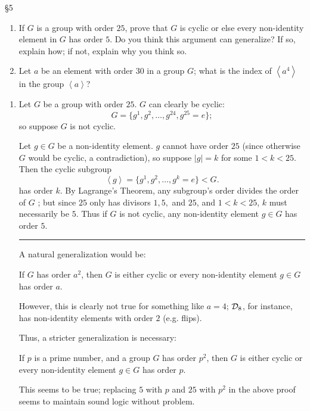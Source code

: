 \documentclass{homework}
\begin{document}
\begin{problem}{\S 5}
  \begin{enumerate}[label=(\alph*)]
    \item If $G$ is a group with order $25$, prove that $G$ is cyclic or else every non-identity
      element in $G$ has order $5$. Do you think this argument can generalize? If so, explain how;
      if not, explain why you think so.
    \item Let $a$ be an element with order $30$ in a group $G$; what is the index of $\left<a^{4}
      \right>$ in the group $\left<a \right>$?
  \end{enumerate}
\end{problem}

\begin{solution}
  \begin{enumerate}[label=(\alph*)]
    \item 
      Let $G$ be a group with order $25$. $G$ can clearly be cyclic: \[
        G=\{ g^{1},g^2,\ldots,g^{24},g^{25}=e \}
      ;\] so suppose $G$ is not cyclic.

      Let $g\in G$ be a non-identity element. $g$ cannot have order $25$ (since otherwise $G$ would be
      cyclic, a contradiction),  so suppose $\left| g \right| =k$ for some $1<k<25$. Then the cyclic
      subgroup \[
        \left<g \right> = \{ g^{1},g^2,\ldots,g^{k}=e \} < G
      .\] has order $k$. By Lagrange's Theorem, any subgroup's order divides the order of $G$ ; but
      since $25$ only has divisors $1,5,$ and $25$, and $1<k<25$, $k$ must necessarily be $5$. Thus if
      $G$ is not cyclic, any non-identity element $g\in G$ has order $5$.
      \hrule
      A natural generalization would be:
      \begin{center}
        If  $G$ has order $a^2$, then $G$ is either cyclic or every non-identity element $g\in G$ has
        order $a$.
      \end{center}
      However, this is clearly not true for something like $a=4$; $\mathcal{D}_8$, for instance, has
      non-identity elements with order $2$ (e.g. flips).

      Thus, a stricter generalization is necessary:
      \begin{center}
        If $p$ is a prime number, and a group $G$ has order $p^2$, then $G$ is either cyclic or
        every non-identity element $g\in G$ has order $p$.
      \end{center}
      This seems to be true; replacing $5$ with $p$ and $25$ with $p^2$ in the above proof seems to
      maintain sound logic without problem.


\end{enumerate}
\end{solution}
\end{document}
